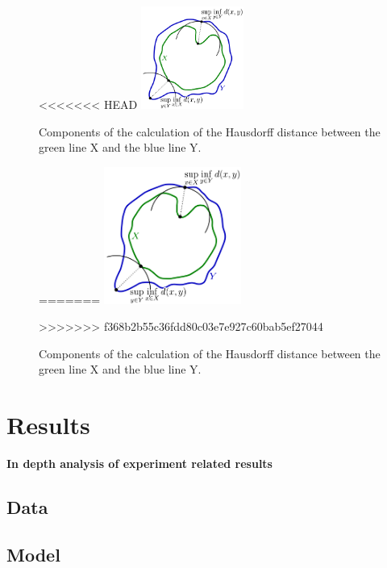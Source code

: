 \documentclass[journal]{IEEEtran}
\begin{document}
	\begin{figure}[h]
		\centering
<<<<<<< HEAD
		\includegraphics[width=0.3\textwidth]{haussdorfGraphics.png}
		\caption{Components of the calculation of the Hausdorff distance between the green line X and the blue line Y.}
		\label{fig:figure3}
=======
		\includegraphics[width=0.4\textwidth]{haussdorfGraphics}
		\caption{Components of the calculation of the Hausdorff distance between the green line X and the blue line Y.}
		\label{fig:e3}
>>>>>>> f368b2b55c36fdd80c03e7e927c60bab5ef27044
	\end{figure}



\section{Results}
\textbf{In depth analysis of experiment related results}

\subsection{Data}
\subsection{Model}
\end{document}
